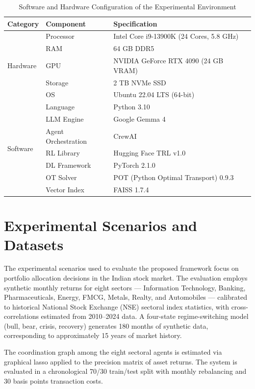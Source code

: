 \documentclass[12pt,a4paper,oneside]{report}
\theoremstyle{definition}
\theoremstyle{remark}
\begin{document}
\begin{table}[h!]
\centering
\renewcommand{\arraystretch}{1.4}
\caption{Software and Hardware Configuration of the Experimental Environment}
\label{tab:hw_sw_config}
\begin{tabular}{|l|l|l|}
\hline
\textbf{Category} & \textbf{Component} & \textbf{Specification} \\
\hline
\multirow{5}{*}{Hardware} & Processor & Intel Core i9-13900K (24 Cores, 5.8 GHz) \\
 & RAM & 64 GB DDR5 \\
 & GPU & NVIDIA GeForce RTX 4090 (24 GB VRAM) \\
 & Storage & 2 TB NVMe SSD \\
 & OS & Ubuntu 22.04 LTS (64-bit) \\
\hline
\multirow{7}{*}{Software} & Language & Python 3.10 \\
 & LLM Engine & Google Gemma 4 \\
 & Agent Orchestration & CrewAI \\
 & RL Library & Hugging Face TRL v1.0 \\
 & DL Framework & PyTorch 2.1.0 \\
 & OT Solver & POT (Python Optimal Transport) 0.9.3 \\
 & Vector Index & FAISS 1.7.4 \\
\hline
\end{tabular}
\end{table}

\section{Experimental Scenarios and Datasets}

The experimental scenarios used to evaluate the proposed framework focus on portfolio allocation decisions in the Indian stock market. The evaluation employs synthetic monthly returns for eight sectors --- Information Technology, Banking, Pharmaceuticals, Energy, FMCG, Metals, Realty, and Automobiles --- calibrated to historical National Stock Exchange (NSE) sectoral index statistics, with cross-correlations estimated from 2010--2024 data. A four-state regime-switching model (bull, bear, crisis, recovery) generates 180 months of synthetic data, corresponding to approximately 15 years of market history.

The coordination graph among the eight sectoral agents is estimated via graphical lasso applied to the precision matrix of asset returns. The system is evaluated in a chronological 70/30 train/test split with monthly rebalancing and 30 basis points transaction costs.
\end{document}
